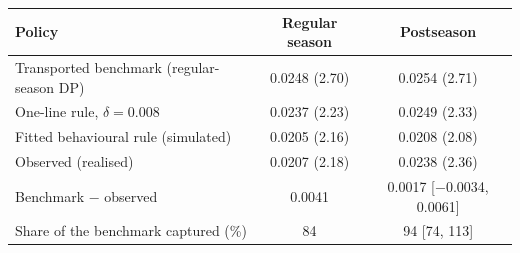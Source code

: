 \begin{tabular}{lcc}
\toprule
Policy & Regular season & Postseason \\
\midrule
Transported benchmark (regular-season DP) & 0.0248 (2.70) & 0.0254 (2.71) \\
One-line rule, $\delta=0.008$ & 0.0237 (2.23) & 0.0249 (2.33) \\
Fitted behavioural rule (simulated) & 0.0205 (2.16) & 0.0208 (2.08) \\
Observed (realised) & 0.0207 (2.18) & 0.0238 (2.36) \\
Benchmark $-$ observed & 0.0041 & 0.0017 [\ensuremath{-}0.0034, 0.0061] \\
Share of the benchmark captured (\%) & 84 & 94 [74, 113] \\
\bottomrule
\end{tabular}
